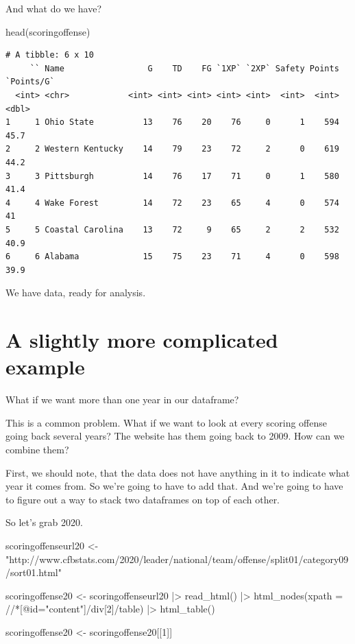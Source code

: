 \documentclass[
  letterpaper,
  DIV=11,
  numbers=noendperiod]{scrreprt}
\newenvironment{Shaded}{\begin{snugshade}}{\end{snugshade}}
\newcommand{\AttributeTok}[1]{\textcolor[rgb]{0.40,0.45,0.13}{#1}}
\newcommand{\DecValTok}[1]{\textcolor[rgb]{0.68,0.00,0.00}{#1}}
\newcommand{\FunctionTok}[1]{\textcolor[rgb]{0.28,0.35,0.67}{#1}}
\newcommand{\NormalTok}[1]{\textcolor[rgb]{0.00,0.23,0.31}{#1}}
\newcommand{\OtherTok}[1]{\textcolor[rgb]{0.00,0.23,0.31}{#1}}
\newcommand{\SpecialCharTok}[1]{\textcolor[rgb]{0.37,0.37,0.37}{#1}}
\newcommand{\StringTok}[1]{\textcolor[rgb]{0.13,0.47,0.30}{#1}}
\begin{document}
And what do we have?

\begin{Shaded}
\begin{Highlighting}[]
\FunctionTok{head}\NormalTok{(scoringoffense)}
\end{Highlighting}
\end{Shaded}

\begin{verbatim}
# A tibble: 6 x 10
     `` Name                 G    TD    FG `1XP` `2XP` Safety Points `Points/G`
  <int> <chr>            <int> <int> <int> <int> <int>  <int>  <int>      <dbl>
1     1 Ohio State          13    76    20    76     0      1    594       45.7
2     2 Western Kentucky    14    79    23    72     2      0    619       44.2
3     3 Pittsburgh          14    76    17    71     0      1    580       41.4
4     4 Wake Forest         14    72    23    65     4      0    574       41  
5     5 Coastal Carolina    13    72     9    65     2      2    532       40.9
6     6 Alabama             15    75    23    71     4      0    598       39.9
\end{verbatim}

We have data, ready for analysis.

\hypertarget{a-slightly-more-complicated-example}{%
\section{A slightly more complicated
example}\label{a-slightly-more-complicated-example}}

What if we want more than one year in our dataframe?

This is a common problem. What if we want to look at every scoring
offense going back several years? The website has them going back to
2009. How can we combine them?

First, we should note, that the data does not have anything in it to
indicate what year it comes from. So we're going to have to add that.
And we're going to have to figure out a way to stack two dataframes on
top of each other.

So let's grab 2020.

\begin{Shaded}
\begin{Highlighting}[]
\NormalTok{scoringoffenseurl20 }\OtherTok{\textless{}{-}} \StringTok{"http://www.cfbstats.com/2020/leader/national/team/offense/split01/category09/sort01.html"}

\NormalTok{scoringoffense20 }\OtherTok{\textless{}{-}}\NormalTok{ scoringoffenseurl20 }\SpecialCharTok{|\textgreater{}}
  \FunctionTok{read\_html}\NormalTok{() }\SpecialCharTok{|\textgreater{}}
  \FunctionTok{html\_nodes}\NormalTok{(}\AttributeTok{xpath =} \StringTok{\textquotesingle{}//*[@id="content"]/div[2]/table\textquotesingle{}}\NormalTok{) }\SpecialCharTok{|\textgreater{}}
  \FunctionTok{html\_table}\NormalTok{()}

\NormalTok{scoringoffense20 }\OtherTok{\textless{}{-}}\NormalTok{ scoringoffense20[[}\DecValTok{1}\NormalTok{]]}
\end{Highlighting}
\end{Shaded}
\end{document}
